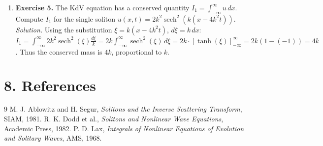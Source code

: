 \begin{enumerate}[leftmargin=*,itemsep=0.9em]
\item \textbf{Exercise 5.} The KdV equation has a conserved quantity $I_1 = \int_{-\infty}^{\infty} u\,dx$. Compute $I_1$ for the single soliton $u(x,t) = 2k^2 \operatorname{sech}^2(k(x - 4k^2 t))$. \emph{Solution.} Using the substitution $\xi = k(x - 4k^2 t)$, $d\xi = k\,dx$: $I_1 = \int_{-\infty}^{\infty} 2k^2 \operatorname{sech}^2(\xi) \frac{d\xi}{k} = 2k \int_{-\infty}^{\infty} \operatorname{sech}^2(\xi)\,d\xi = 2k \cdot [\tanh(\xi)]_{-\infty}^{\infty} = 2k(1 - (-1)) = 4k$. Thus the conserved mass is $4k$, proportional to $k$.

\end{enumerate}
\section*{8. References}
\begin{thebibliography}{9}
 M. J. Ablowitz and H. Segur, \emph{Solitons and the Inverse Scattering Transform}, SIAM, 1981.
 R. K. Dodd et al., \emph{Solitons and Nonlinear Wave Equations}, Academic Press, 1982.
 P. D. Lax, \emph{Integrals of Nonlinear Equations of Evolution and Solitary Waves}, AMS, 1968.
\end{thebibliography}
